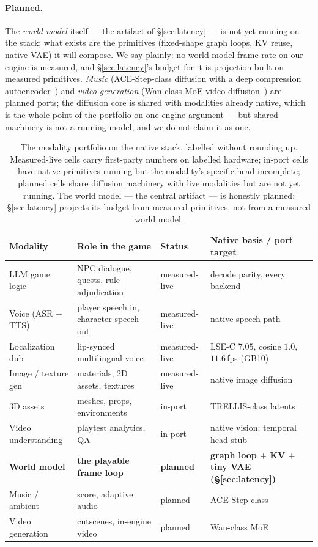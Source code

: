 \documentclass[11pt]{article}
\begin{document}
\paragraph{Planned.} The \emph{world model} itself --- the artifact of \S\ref{sec:latency} --- is not yet
running on the stack; what exists are the primitives (fixed-shape graph loops, KV reuse, native VAE) it will
compose. We say plainly: no world-model frame rate on our engine is measured, and \S\ref{sec:latency}'s
budget for it is projection built on measured primitives. \emph{Music} (ACE-Step-class diffusion with a deep
compression autoencoder~\cite{acestep}) and \emph{video generation} (Wan-class MoE video
diffusion~\cite{wan}) are planned ports; the diffusion core is shared with modalities already native, which is
the whole point of the portfolio-on-one-engine argument --- but shared machinery is not a running model, and we
do not claim it as one.

\begin{table}[t]
\centering
\small
\setlength{\tabcolsep}{5pt}
\begin{tabular}{@{}p{3.4cm}p{4.9cm}p{2.0cm}p{3.6cm}@{}}
\toprule
\textbf{Modality} & \textbf{Role in the game} & \textbf{Status} & \textbf{Native basis / port target} \\
\midrule
LLM game logic & NPC dialogue, quests, rule adjudication & measured-live & decode parity, every backend~\cite{backend} \\
Voice (ASR $+$ TTS) & player speech in, character speech out & measured-live & native speech path \\
Localization dub & lip-synced multilingual voice & measured-live & LSE-C $7.05$, cosine $1.0$, $11.6$\,fps (GB10) \\
Image / texture gen & materials, 2D assets, textures & measured-live & native image diffusion \\
3D assets & meshes, props, environments & in-port & TRELLIS-class latents~\cite{trellis} \\
Video understanding & playtest analytics, QA & in-port & native vision; temporal head stub \\
\textbf{World model} & \textbf{the playable frame loop} & \textbf{planned} & \textbf{graph loop $+$ KV $+$ tiny VAE (\S\ref{sec:latency})} \\
Music / ambient & score, adaptive audio & planned & ACE-Step-class~\cite{acestep} \\
Video generation & cutscenes, in-engine video & planned & Wan-class MoE~\cite{wan} \\
\bottomrule
\end{tabular}
\caption{The modality portfolio on the native stack, labelled without rounding up. Measured-live cells carry
first-party numbers on labelled hardware; in-port cells have native primitives running but the modality's
specific head incomplete; planned cells share diffusion machinery with live modalities but are not yet running.
The world model --- the central artifact --- is honestly planned: \S\ref{sec:latency} projects its budget from
measured primitives, not from a measured world model.}
\label{tab:matrix}
\end{table}
\end{document}
